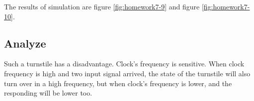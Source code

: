 \documentclass{article}
\begin{document}
    The results of simulation are figure \ref{fig:homework7-9} and figure \ref{fig:homework7-10}.
    
    \subsection{Analyze}
    
    Such a turnstile has a disadvantage. Clock's frequency is sensitive.
    When clock frequency is high and two input signal arrived, the state of the
    turnstile will also turn over in a high frequency, but when clock's frequency
    is lower, and the responding will be lower too.
            
\end{document}
